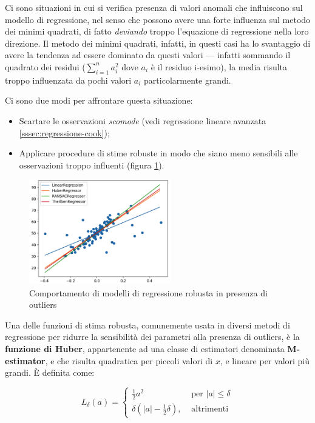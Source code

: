 Ci sono situazioni in cui si verifica presenza di valori anomali che influiscono sul modello di regressione, nel senso che possono avere una forte influenza sul metodo dei minimi quadrati, di fatto \textit{deviando} troppo l'equazione di regressione nella loro direzione. Il metodo dei minimi quadrati, infatti, in questi casi ha lo svantaggio di avere la tendenza ad essere dominato da questi valori — infatti sommando il quadrato dei residui ($\sum_{i=1}^{n} a_i^2$ dove $a_i$ è il residuo i-esimo), la media risulta troppo influenzata da pochi valori $a_i$ particolarmente grandi.

Ci sono due modi per affrontare questa situazione:

\begin{itemize}
  \item Scartare le osservazioni \textit{scomode} (vedi regressione lineare avanzata \ref{sssec:regressione-cook});
  \item Applicare procedure di stime robuste in modo che siano meno sensibili alle osservazioni troppo influenti (figura \ref{fig:reg_rob}).
\end{itemize}

\begin{figure}[H]
\centering
\includegraphics[width=0.55\textwidth,height=\textheight,keepaspectratio]{img/robust.png}
\caption{Comportamento di modelli di regressione robusta in presenza di outliers}
\label{fig:reg_rob}
\end{figure}

Una delle funzioni di stima robusta, comunemente usata in diversi metodi di regressione per ridurre la sensibilità dei parametri alla presenza di outliers, è la \textbf{funzione di Huber}, appartenente ad una classe di estimatori denominata \textbf{M-estimator}, e che risulta quadratica per piccoli valori di $x$, e lineare per valori più grandi. È definita come:

$$L_{\delta}(a)= \begin{cases}\frac{1}{2} a^{2} & \text { per }|a| \leq \delta \\ \delta\left(|a|-\frac{1}{2} \delta\right), & \text { altrimenti }\end{cases}$$\smallskip

